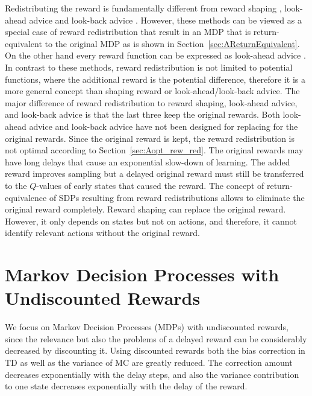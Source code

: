 \documentclass{article}
\begin{document}
\begin{appendices}
Redistributing the reward is fundamentally different from
reward shaping \cite{Ng:99,Wiewiora:03}, look-ahead advice and
look-back advice \cite{Wiewiora:03icml}. 
However, these methods can be viewed as a special case of 
reward redistribution that result in an MDP that is return-equivalent 
to the original MDP as is shown in Section~\ref{sec:AReturnEquivalent}. 
On the other hand every reward function can be expressed as
look-ahead advice \cite{Harutyunyan:15}.
In contrast to these methods, 
reward redistribution is not limited to potential functions, where
the additional reward is the potential difference, therefore it is a more
general concept than shaping reward or look-ahead/look-back advice.
The major difference of reward redistribution to reward shaping,
look-ahead advice, and look-back advice 
is that the last three keep the original rewards. 
Both look-ahead advice and look-back advice 
have not been designed for replacing for the original rewards.
Since the original reward is kept, the reward redistribution is
not optimal according to Section~\ref{sec:Aopt_rew_red}.
The original rewards 
may have long delays that cause an exponential slow-down of learning. 
The added reward improves sampling but a delayed original reward must
still be transferred to the $Q$-values of early states that caused the reward.
The concept of return-equivalence of SDPs resulting from 
reward redistributions allows to 
eliminate the original reward completely.
Reward shaping can replace the original reward.
However, it only depends on states but not on actions, 
and therefore, it cannot identify
relevant actions without the original reward.





\clearpage
\pagebreak


\section{Markov Decision Processes with Undiscounted Rewards}

We focus on Markov Decision Processes (MDPs)
with undiscounted rewards, since
the relevance but also the problems
of a delayed reward can be considerably decreased by discounting it.
Using discounted rewards both the bias correction in TD as well as the variance 
of MC are greatly reduced. The correction amount decreases exponentially with 
the delay steps, and also the variance contribution to one state 
decreases exponentially 
with the delay of the reward.


\end{appendices}
\end{document}
